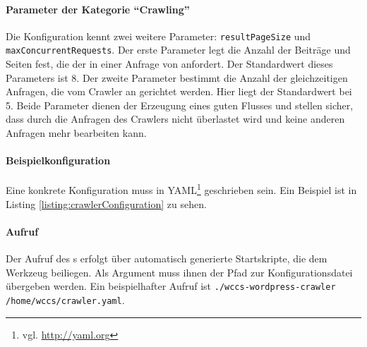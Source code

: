     \paragraph{Parameter der Kategorie "`Crawling"'}
    Die Konfiguration kennt zwei weitere Parameter:
    \texttt{resultPageSize} und \texttt{maxConcurrentRequests}.
    Der erste Parameter legt die Anzahl der Beiträge und Seiten fest,
    die der {\wordpressCrawler} in einer Anfrage von {\wordpress} anfordert.
    Der Standardwert dieses Parameters ist 8.
    Der zweite Parameter bestimmt die Anzahl der gleichzeitigen Anfragen,
    die vom Crawler an {\wordpress} gerichtet werden.
    Hier liegt der Standardwert bei 5.
    Beide Parameter dienen der Erzeugung eines guten Flusses und stellen sicher,
    dass {\wordpress} durch die Anfragen des Crawlers
    nicht überlastet wird und keine anderen Anfragen mehr bearbeiten kann.

    \paragraph{Beispielkonfiguration}
    Eine konkrete Konfiguration muss in YAML\footnote{vgl. \url{http://yaml.org}} geschrieben sein.
    Ein Beispiel ist in Listing \ref{listing:crawlerConfiguration} zu sehen.

    

    \paragraph{Aufruf}
    Der Aufruf des {\wordpressCrawler}s erfolgt über automatisch generierte Startskripte,
    die dem Werkzeug beiliegen.
    Als Argument muss ihnen der Pfad zur Konfigurationsdatei übergeben werden.
    Ein beispielhafter Aufruf ist \texttt{./wccs-wordpress-crawler /home/wccs/crawler.yaml}.
